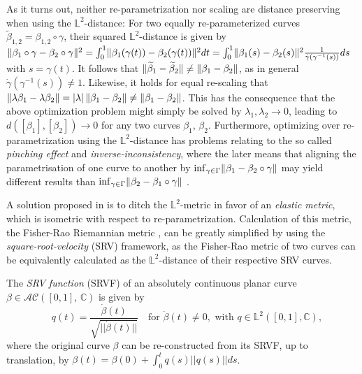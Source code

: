 As it turns out, neither re-parametrization nor scaling are distance preserving when using the $\mathbb{L}^2$-distance:
For two equally re-parameterized curves $\widetilde\beta_{1,2} = \beta_{1,2} \circ \gamma$, their squared $\mathbb{L}^2$-distance is given by $\lVert\beta_1 \circ \gamma - \beta_2 \circ \gamma\rVert^2 = \int_0^1 \lVert\beta_1(\gamma(t)) - \beta_2(\gamma(t))\rVert^2 dt = \int_0^1 \lVert\beta_1(s) - \beta_2(s)\rVert^2 \frac{1}{\dot\gamma(\gamma^{-1}(s))} ds$ with $s = \gamma(t)$.
It follows that $\lVert\widetilde\beta_1 - \widetilde\beta_2\rVert \neq \lVert\beta_1 - \beta_2\rVert$, as in general $\dot\gamma(\gamma^{-1}(s)) \neq 1$.
Likewise, it holds for equal re-scaling that $\lVert\lambda \beta_1 - \lambda \beta_2\rVert = \lvert\lambda\rvert\, \lVert\beta_1 - \beta_2\rVert \neq \lVert\beta_1 - \beta_2\rVert$.
This has the consequence that the above optimization problem might simply be solved by $\lambda_1, \lambda_2 \rightarrow 0$, leading to $d([\beta_1], [\beta_2]) \rightarrow 0$ for any two curves $\beta_1$, $\beta_2$.
Furthermore, optimizing over re-parametrization using the $\mathbb{L}^2$-distance has problems relating to the so called \textit{pinching effect} and \textit{inverse-inconsistency}, where the later means that aligning the parametrisation of one curve to another by $\inf_{\gamma \in \Gamma} \lVert\beta_1 - \beta_2 \circ \gamma\rVert$ may yield different results than $\inf_{\gamma \in \Gamma} \lVert\beta_2 - \beta_1 \circ \gamma\rVert$ \parencite[see][88]{SrivastavaKlassen2016}.

A solution proposed in \cite{SrivastavaEtAl2011} is to ditch the $\mathbb{L}^2$-metric in favor of an \textit{elastic metric}, which is isometric with respect to re-parametrization.
Calculation of this metric, the Fisher-Rao Riemannian metric \parencite{Rao1945}, can be greatly simplified by using the \textit{square-root-velocity} (SRV) framework, as the Fisher-Rao metric of two curves can be equivalently calculated as the $\mathbb{L}^2$-distance of their respective SRV curves.

\begin{definition}
  The \emph{SRV function} (SRVF) of an absolutely continuous planar curve $\beta \in \mathcal{AC}([0,1],\,\mathbb{C})$ is given by
  $$ \quad q(t) = \frac{\dot{\beta}(t)}{\sqrt{|| \dot{\beta}(t) ||}} \quad \text{for} \,\, \dot{\beta}(t) \neq 0, \,\, \text{with} \,\, q \in \mathbb{L}^2([0,1], \mathbb{C}),$$
  where the original curve $\beta$ can be re-constructed from its SRVF, up to translation, by $\beta(t) = \beta(0) + \int_0^t q(s) || q(s) || ds$.
\end{definition}


